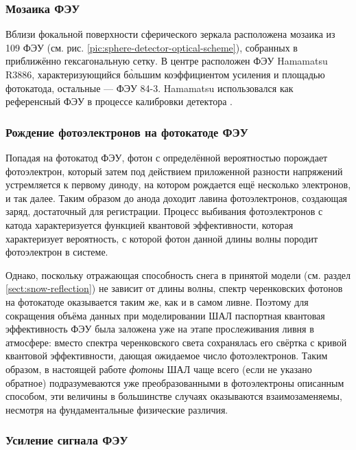 \subsubsection{Мозаика ФЭУ}
\label{sec:pmt-mosaic-details}

Вблизи фокальной поверхности сферического зеркала расположена мозаика из 109 ФЭУ (см. рис. \ref{pic:sphere-detector-optical-scheme}), собранных в приближённо гексагональную сетку. В центре расположен ФЭУ Hamamatsu R3886, характеризующийся б\`{о}льшим коэффициентом усиления и площадью фотокатода, остальные --- ФЭУ 84-3. Hamamatsu использовался как референсный ФЭУ в процессе калибровки детектора \cite{SphereCalibration2016}.

\subsubsection{Рождение фотоэлектронов на фотокатоде ФЭУ}

\label{sec:photon-to-phels-conversion}

Попадая на фотокатод ФЭУ, фотон с определённой вероятностью порождает фотоэлектрон, который затем под действием приложенной разности напряжений устремляется к первому диноду, на котором рождается ещё несколько электронов, и так далее. Таким образом до анода доходит лавина фотоэлектронов, создающая заряд, достаточный для регистрации. Процесс выбивания фотоэлектронов с катода характеризуется функцией квантовой эффективности, которая характеризует вероятность, с которой фотон данной длины волны породит фотоэлектрон в системе.

Однако, поскольку отражающая способность снега в принятой модели (см. раздел \ref{sect:snow-reflection}) не зависит от длины волны, спектр черенковских фотонов на фотокатоде оказывается таким же, как и в самом ливне. Поэтому для сокращения объёма данных при моделировании ШАЛ паспортная квантовая эффективность ФЭУ была заложена уже на этапе прослеживания ливня в атмосфере: вместо спектра черенковского света сохранялась его свёртка с кривой квантовой эффективности, дающая ожидаемое число фотоэлектронов. Таким образом, в настоящей работе \textit{фотоны} ШАЛ чаще всего (если не указано обратное) подразумеваются уже преобразованными в фотоэлектроны описанным способом, эти величины в большинстве случаях оказываются взаимозаменяемы, несмотря на фундаментальные физические различия.


\subsubsection{Усиление сигнала ФЭУ}
\label{sec:pmt-amplification-description}

